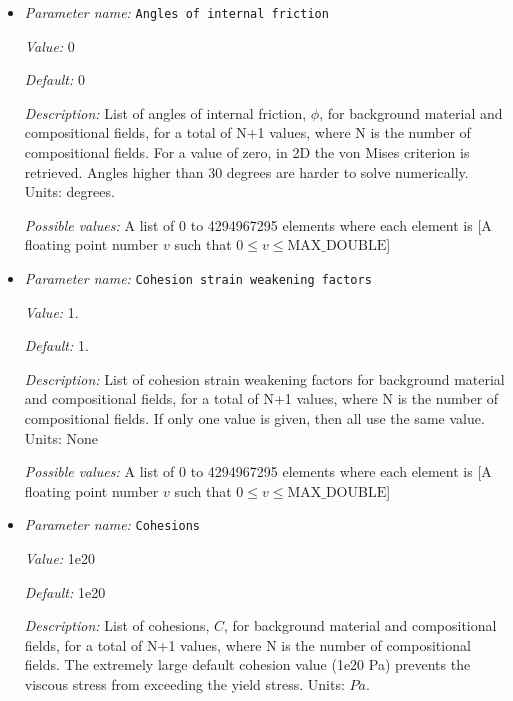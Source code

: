 \begin{itemize}
{\it Possible values:} A floating point number $v$ such that $0 \leq v \leq \text{MAX\_DOUBLE}$
\item {\it Parameter name:} {\tt Angles of internal friction}
\label{parameters:Material model/Visco Plastic/Angles of internal friction}


{\it Value:} 0


{\it Default:} 0


{\it Description:} List of angles of internal friction, $\phi$, for background material and compositional fields, for a total of N+1 values, where N is the number of compositional fields. For a value of zero, in 2D the von Mises criterion is retrieved. Angles higher than 30 degrees are harder to solve numerically. Units: degrees.


{\it Possible values:} A list of 0 to 4294967295 elements where each element is [A floating point number $v$ such that $0 \leq v \leq \text{MAX\_DOUBLE}$]
\item {\it Parameter name:} {\tt Cohesion strain weakening factors}
\label{parameters:Material model/Visco Plastic/Cohesion strain weakening factors}


{\it Value:} 1.


{\it Default:} 1.


{\it Description:} List of cohesion strain weakening factors for background material and compositional fields, for a total of N+1 values, where N is the number of compositional fields. If only one value is given, then all use the same value.  Units: None


{\it Possible values:} A list of 0 to 4294967295 elements where each element is [A floating point number $v$ such that $0 \leq v \leq \text{MAX\_DOUBLE}$]
\item {\it Parameter name:} {\tt Cohesions}
\label{parameters:Material model/Visco Plastic/Cohesions}


{\it Value:} 1e20


{\it Default:} 1e20


{\it Description:} List of cohesions, $C$, for background material and compositional fields, for a total of N+1 values, where N is the number of compositional fields. The extremely large default cohesion value (1e20 Pa) prevents the viscous stress from exceeding the yield stress. Units: $Pa$.



\end{itemize}
